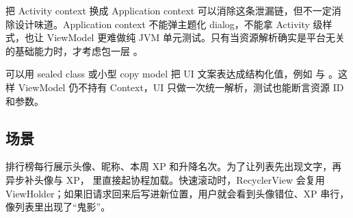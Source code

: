\begin{pitfall}
把 Activity context 换成 Application context 可以消除这条泄漏链，但不一定消除设计味道。Application context 不能弹主题化 dialog，不能拿 Activity 级样式，也让 ViewModel 更难做纯 JVM 单元测试。只有当资源解析确实是平台无关的基础能力时，才考虑包一层 。
\end{pitfall}

\begin{followup}
可以用 sealed class 或小型 copy model 把 UI 文案表达成结构化值，例如  与 。这样 ViewModel 仍不持有 Context，UI 只做一次统一解析，测试也能断言资源 ID 和参数。
\end{followup}


\subsection*{场景}
排行榜每行展示头像、昵称、本周 XP 和升降名次。为了让列表先出现文字，再异步补头像与 XP， 里直接起协程加载。快速滚动时，RecyclerView 会复用 ViewHolder；如果旧请求回来后写进新位置，用户就会看到头像错位、XP 串行，像列表里出现了“鬼影”。

